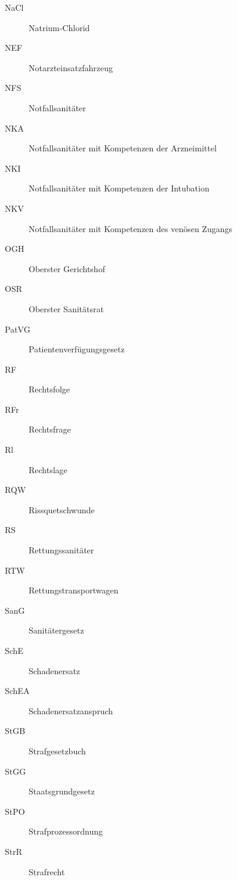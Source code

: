 \begin{multicols}{2}
\begin{description}
\item[NaCl]  Natrium-Chlorid

\item[NEF]  Notarzteinsatzfahrzeug

\item[NFS]  Notfallsanitäter

\item[NKA]  Notfallsanitäter mit Kompetenzen der
Arzneimittel

\item[NKI]  Notfallsanitäter mit Kompetenzen der
Intubation

\item[NKV]  Notfallsanitäter mit Kompetenzen des
ven\"osen Zugangs

\item[OGH]  Oberster Gerichtshof

\item[OSR]  Oberster Sanitätsrat


\item[PatVG]  Patienten\-ver\-f\"ugungs\-gesetz

\item[RF]  Rechtsfolge

\item[RFr]  Rechtsfrage

\item[Rl]  Rechtslage

\item[RQW]  Rissquetschwunde

\item[RS]  Rettungssanitäter

\item[RTW]  Rettungstransportwagen

\item[SanG]  Sanitätergesetz

\item[SchE]  Schadenersatz

\item[SchEA]  Schadenersatzanspruch

\item[StGB]  Strafgesetzbuch

\item[StGG]  Staatsgrundgesetz

\item[StPO]  Strafprozessordnung

\item[StrR]  Strafrecht


\end{description}
\end{multicols}
